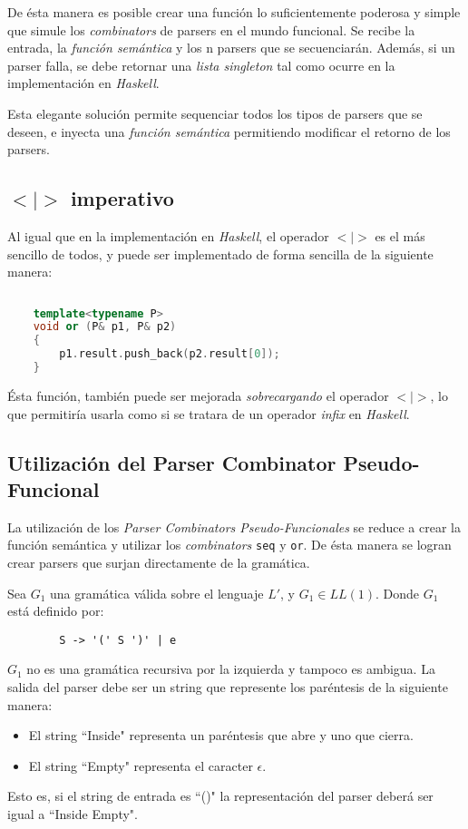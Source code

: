 	De ésta manera es posible crear una función lo suficientemente poderosa y simple que simule los \emph{combinators} de parsers en el mundo funcional. Se recibe la entrada, la \emph{función semántica} y los n parsers que se secuenciarán. Además, si un parser falla, se debe retornar una \emph{lista singleton} tal como ocurre en la implementación en \emph{Haskell}.
	
	Esta elegante solución permite sequenciar todos los tipos de parsers que se deseen, e inyecta una \emph{función semántica} permitiendo modificar el retorno de los parsers.
	
	\subsection{$<|>$ imperativo}
	Al igual que en la implementación en \emph{Haskell}, el operador $<|>$ es el más sencillo de todos, y puede ser implementado de forma sencilla de la siguiente manera:\newpage
	\begin{lstlisting}[language=C++, caption=función de elección en C++]
	
	template<typename P>
	void or (P& p1, P& p2)
	{
		p1.result.push_back(p2.result[0]);
	}	
	\end{lstlisting}
		
	Ésta función, también puede ser mejorada \emph{sobrecargando} el operador $<|>$, lo que permitiría usarla como si se tratara de un operador \emph{infix} en \emph{Haskell}.
	
	\subsection{Utilización del Parser Combinator Pseudo-Funcional}
	La utilización de los \emph{Parser Combinators Pseudo-Funcionales} se reduce a crear la función semántica y utilizar los \emph{combinators} \texttt{seq} y \texttt{or}. De ésta manera se logran crear parsers que surjan directamente de la gramática.
	
	\begin{exmp}
		Sea $G_1$ una gramática válida sobre el lenguaje $L'$, y $G_1 \in LL(1)$.
		Donde $G_1$ está definido por:
		
		\begin{lstlisting}
		S -> '(' S ')' | e
		\end{lstlisting}
		
		$G_1$ no es una gramática recursiva por la izquierda y tampoco es ambigua.
		La salida del parser debe ser un string que represente los paréntesis de la siguiente manera:
		\begin{itemize}
			\item El string ``Inside" representa un paréntesis que abre y uno que cierra.
			\item El string ``Empty" representa el caracter $\epsilon$.
		\end{itemize}
		Esto es, si el string de entrada es ``()" la representación del parser deberá ser igual a ``Inside Empty".		
	\end{exmp}
	
